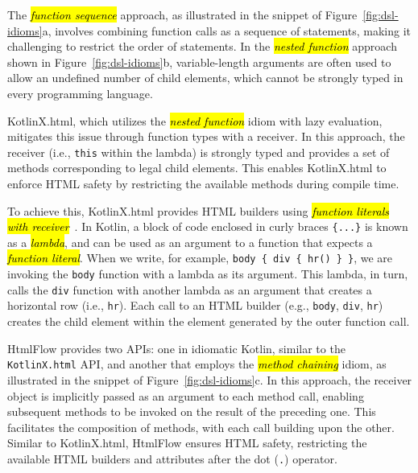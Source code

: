 \documentclass[software,article,accept,pdftex,moreauthors]{Definitions/mdpi}
\begin{document}
The \textit{\hl{function sequence}} approach, as illustrated in the snippet of
Figure~\ref{fig:dsl-idioms}a, involves combining function calls as a sequence
of statements, making it challenging to restrict the order of statements. In
the \textit{\hl{nested function}} approach shown in Figure~\ref{fig:dsl-idioms}b,
variable-length arguments are often used to allow an undefined number of child
elements, which cannot be strongly typed in every programming language.

KotlinX.html, which utilizes the \textit{\hl{nested function}} idiom with lazy
evaluation, mitigates this issue through function types with a receiver. In
this approach, the receiver (i.e., \texttt{this} within the lambda) is strongly
typed and provides a set of methods corresponding to legal child elements. This
enables KotlinX.html to enforce HTML safety by restricting the available
methods during compile time.

To achieve this, KotlinX.html provides HTML builders using \textit{\hl{function
  literals with receiver}}~\cite{kotlinlang}. In Kotlin, a block of code enclosed
in curly braces \texttt{\{...\}} is known as a \emph{\hl{lambda}}, and can be used
as an argument to a function that expects a \emph{\hl{function literal}}. When we
write, for example, \texttt{body \{ div \{ hr() \} \}}, we are invoking the
\texttt{body} function with a lambda as its argument. This lambda, in turn,
calls the \texttt{div} function with another lambda as an argument that creates
a horizontal row (i.e., \texttt{hr}). Each call to an HTML builder (e.g.,
\texttt{body}, \texttt{div}, \texttt{hr}) creates the child element within the
element generated by the outer function call.

HtmlFlow provides two APIs: one in idiomatic Kotlin, similar to the
\texttt{KotlinX.html} API, and another that employs the \textit{\hl{method
  chaining}} idiom, as illustrated in the snippet of
Figure~\ref{fig:dsl-idioms}c. In this approach, the receiver object is
implicitly passed as an argument to each method call, enabling subsequent
methods to be invoked on the result of the preceding one. This facilitates the
composition of methods, with each call building upon the other. Similar to
KotlinX.html, HtmlFlow ensures HTML safety, restricting the available HTML
builders and attributes after the dot (\texttt{.}) operator.

\end{document}
